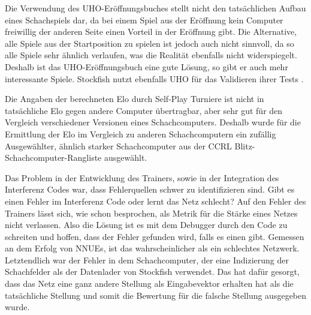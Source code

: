 

Die Verwendung des \ac{UHO}-Eröffnungsbuches stellt nicht den tatsächlichen Aufbau eines Schachspiels dar, da bei einem Spiel aus der Eröffnung kein Computer freiwillig der anderen Seite einen Vorteil in der Eröffnung gibt. Die Alternative, alle Spiele aus der Startposition zu spielen ist jedoch auch nicht sinnvoll, da so alle Spiele sehr ähnlich verlaufen, was die Realität ebenfalls nicht widerspiegelt. Deshalb ist das \ac{UHO}-Eröffnungsbuch eine gute Lösung, so gibt er auch mehr interessante Spiele. Stockfish nutzt ebenfalls \ac{UHO} für das Validieren ihrer Tests \cite{Fishtest}. 

Die Angaben der berechneten Elo durch Self-Play Turniere ist nicht in tatsächliche Elo gegen andere Computer übertragbar, aber sehr gut für den Vergleich verschiedener Versionen eines Schachcomputers. Deshalb wurde für die Ermittlung der Elo im Vergleich zu anderen Schachcomputern ein zufällig Ausgewählter, ähnlich starker Schachcomputer aus der \ac{CCRL} \cite{CCRL} Blitz-Schachcomputer-Rangliste ausgewählt.

Das Problem in der Entwicklung des Trainers, sowie in der Integration des Interferenz Codes war, dass Fehlerquellen schwer zu identifizieren sind. Gibt es einen Fehler im Interferenz Code oder lernt das Netz schlecht? Auf den Fehler des Trainers lässt sich, wie schon besprochen, als Metrik für die Stärke eines Netzes nicht verlassen. Also die Lösung ist es mit dem Debugger durch den Code zu schreiten und hoffen, dass der Fehler gefunden wird, falls es einen gibt. Gemessen an dem Erfolg von \acp{NNUE}, ist das wahrscheinlicher als ein schlechtes Netzwerk. Letztendlich war der Fehler in dem Schachcomputer, der eine Indizierung der Schachfelder als der Datenlader von Stockfish verwendet. Das hat dafür gesorgt, dass das Netz eine ganz andere Stellung als Eingabevektor erhalten hat als die tatsächliche Stellung und somit die Bewertung für die falsche Stellung ausgegeben wurde.

